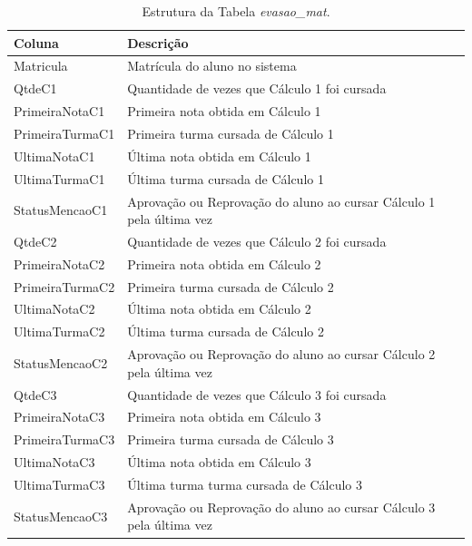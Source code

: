		\begin{longtable}{C{4cm}|C{12cm}}
			\caption{Estrutura da Tabela \textit{evasao\_mat}.} \label{evasao-mat}\\
			\hline
			Coluna & Descrição\\
			\hline
			Matricula & Matrícula do aluno no sistema\\
			QtdeC1 & Quantidade de vezes que Cálculo 1 foi cursada\\
			PrimeiraNotaC1 & Primeira nota obtida em Cálculo 1\\
			PrimeiraTurmaC1 & Primeira turma cursada de Cálculo 1\\
			UltimaNotaC1 & Última nota obtida em Cálculo 1\\
			UltimaTurmaC1 & Última turma cursada de Cálculo 1\\
			StatusMencaoC1 & Aprovação ou Reprovação do aluno ao cursar Cálculo 1 pela última vez\\
			QtdeC2 & Quantidade de vezes que Cálculo 2 foi cursada\\
			PrimeiraNotaC2 & Primeira nota obtida em Cálculo 2\\
			PrimeiraTurmaC2 & Primeira turma cursada de Cálculo 2\\
			UltimaNotaC2 & Última nota obtida em Cálculo 2\\
			UltimaTurmaC2 & Última turma cursada de Cálculo 2\\
			StatusMencaoC2 & Aprovação ou Reprovação do aluno ao cursar Cálculo 2 pela última vez\\
			QtdeC3 & Quantidade de vezes que Cálculo 3 foi cursada\\
			PrimeiraNotaC3 & Primeira nota obtida em Cálculo 3\\
			PrimeiraTurmaC3 & Primeira turma cursada de Cálculo 3\\
			UltimaNotaC3 & Última nota obtida em Cálculo 3\\
			UltimaTurmaC3 & Última turma turma cursada de Cálculo 3\\
			StatusMencaoC3 & Aprovação ou Reprovação do aluno ao cursar Cálculo 3 pela última vez\\
			\hline
		\end{longtable}
		
